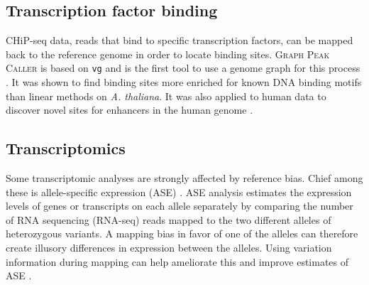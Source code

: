%


\subsection{Transcription factor binding}

CHiP-seq data, reads that bind to specific transcription factors, can be mapped back to the reference genome in order to locate binding sites.
\textsc{Graph Peak Caller} is based on \texttt{vg} and is the first tool to use a genome graph for this process \cite{Grytten_2019}.
It was shown to find binding sites more enriched for known DNA binding motifs than linear methods on \emph{A. thaliana}.
It was also applied to human data to discover novel sites for enhancers in the human genome \cite{groza2019personalized}. 


\subsection{Transcriptomics}
\label{sec:transcriptomics}

Some transcriptomic analyses are strongly affected by reference bias.
Chief among these is allele-specific expression (ASE) \cite{Degner2009-vw,stevenson2013sources,Castel2015-ef}.
ASE analysis estimates the expression levels of genes or transcripts on each allele separately by comparing the number of RNA sequencing (RNA-seq) reads mapped to the two different alleles of heterozygous variants.
A mapping bias in favor of one of the alleles can therefore create illusory differences in expression between the alleles.
Using variation information during mapping can help ameliorate this and improve estimates of ASE \cite{Castel2015-ef,Miao2018-ps}.

